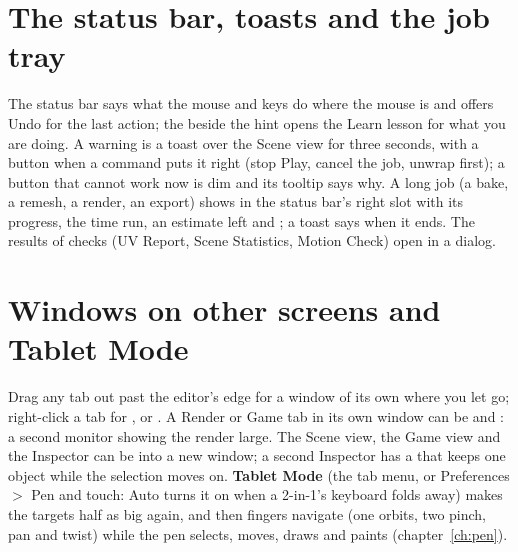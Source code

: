 \section{The status bar, toasts and the job tray}
The status bar says what the mouse and keys do where the mouse is and offers Undo for the last action; the 
beside the hint opens the Learn lesson for what you are doing. A warning is a toast over the Scene view for three
seconds, with a  button when a command puts it right (stop Play, cancel the job, unwrap first); a button that
cannot work now is dim and its tooltip says why. A long job (a bake, a remesh, a render, an export) shows in the status
bar's right slot with its progress, the time run, an estimate left and ; a toast says when it ends. The
results of checks (UV Report, Scene Statistics, Motion Check) open in a  dialog.

\section{Windows on other screens and Tablet Mode}
Drag any tab out past the editor's edge for a window of its own where you let go; right-click a tab for ,  or . A Render or Game tab in its own window can be  and : a second monitor showing the render large. The Scene view, the Game view and the Inspector
can be  into a new window; a second Inspector has a  that keeps one object while the selection
moves on. \textbf{Tablet Mode} (the tab menu, or Preferences $>$ Pen and touch: Auto turns it on when a 2-in-1's
keyboard folds away) makes the targets half as big again, and then fingers navigate (one orbits, two pinch, pan and
twist) while the pen selects, moves, draws and paints (chapter~\ref{ch:pen}).

